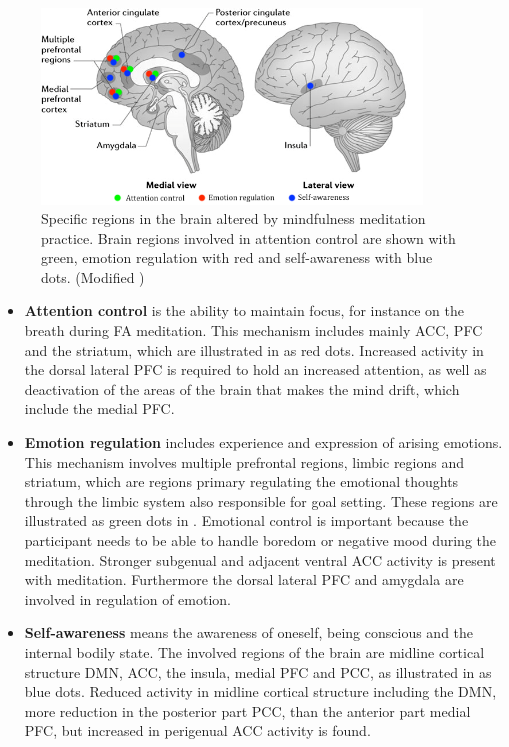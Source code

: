 \begin{figure}[H]
	\includegraphics[width=0.9\textwidth]{figures/brain_meditation.png} 
\caption{Specific regions in the brain altered by mindfulness meditation practice. Brain regions involved in attention control are shown with green, emotion regulation with red and self-awareness with blue dots. (Modified \cite{Tang2017})}
\label{fig:brain_meditation}  
\end{figure}

  
\begin{itemize}
	\item \textbf{Attention control} is the ability to maintain focus, for instance on the breath during FA meditation. This mechanism includes mainly ACC, PFC and the striatum, which are illustrated in  as red dots. Increased activity in the dorsal lateral PFC is required to hold an increased attention, as well as deactivation of the areas of the brain that makes the mind drift, which include the medial PFC. \cite{Tang2017}
	\item \textbf{Emotion regulation} includes experience and expression of arising emotions. This mechanism involves multiple prefrontal regions, limbic regions and striatum, which are regions primary regulating the emotional thoughts through the limbic system also responsible for goal setting. These regions are illustrated as green dots in . Emotional control is important because the participant needs to be able to handle boredom or negative mood during the meditation. Stronger subgenual and adjacent ventral ACC activity is present with meditation. Furthermore the dorsal lateral PFC and amygdala are involved in regulation of emotion. \cite{Tang2017}
	\item \textbf{Self-awareness} means the awareness of oneself, being conscious and the internal bodily state. The involved regions of the brain are midline cortical structure DMN, ACC, the insula, medial PFC and PCC, as illustrated in  as blue dots. Reduced activity in midline cortical structure including the DMN, more reduction in the posterior part PCC, than the anterior part medial PFC, but increased in perigenual ACC activity is found.  \cite{Tang2017}
\end{itemize}


